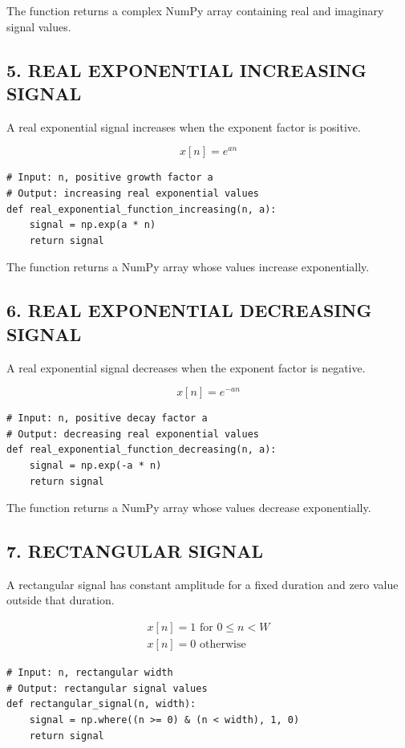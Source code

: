 \documentclass[12pt,a4paper]{article}
\begin{document}
The function returns a complex NumPy array containing real and imaginary signal values.

\subsection*{5. REAL EXPONENTIAL INCREASING SIGNAL}

A real exponential signal increases when the exponent factor is positive.

\[
x[n] = e^{an}
\]

\begin{lstlisting}[style=pythoncode]
# Input: n, positive growth factor a
# Output: increasing real exponential values
def real_exponential_function_increasing(n, a):
    signal = np.exp(a * n)
    return signal
\end{lstlisting}

The function returns a NumPy array whose values increase exponentially.

\subsection*{6. REAL EXPONENTIAL DECREASING SIGNAL}

A real exponential signal decreases when the exponent factor is negative.

\[
x[n] = e^{-an}
\]

\begin{lstlisting}[style=pythoncode]
# Input: n, positive decay factor a
# Output: decreasing real exponential values
def real_exponential_function_decreasing(n, a):
    signal = np.exp(-a * n)
    return signal
\end{lstlisting}

The function returns a NumPy array whose values decrease exponentially.

\subsection*{7. RECTANGULAR SIGNAL}

A rectangular signal has constant amplitude for a fixed duration and zero value outside that duration.

\[
\begin{aligned}
x[n] = 1 \text{ for } 0 \leq n < W \\
x[n] = 0 \text{ otherwise}
\end{aligned}
\]

\begin{lstlisting}[style=pythoncode]
# Input: n, rectangular width
# Output: rectangular signal values
def rectangular_signal(n, width):
    signal = np.where((n >= 0) & (n < width), 1, 0)
    return signal
\end{lstlisting}
\end{document}
